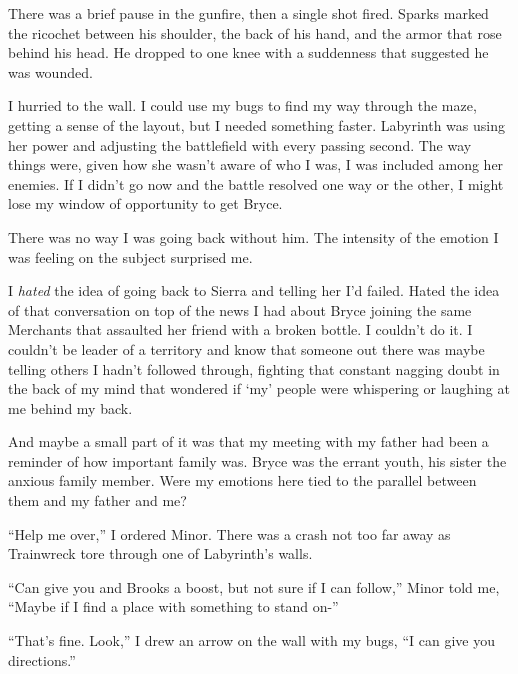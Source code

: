 There was a brief pause in the gunfire, then a single shot fired.  Sparks marked the ricochet between his shoulder, the back of his hand, and the armor that rose behind his head.  He dropped to one knee with a suddenness that suggested he was wounded.



I hurried to the wall.  I could use my bugs to find my way through the maze, getting a sense of the layout, but I needed something faster.  Labyrinth was using her power and adjusting the battlefield with every passing second.  The way things were, given how she wasn't aware of who I was, I was included among her enemies.  If I didn't go now and the battle resolved one way or the other, I might lose my window of opportunity to get Bryce.



There was no way I was going back without him.  The intensity of the emotion I was feeling on the subject surprised me.



I \emph{hated} the idea of going back to Sierra and telling her I'd failed.  Hated the idea of that conversation on top of the news I had about Bryce joining the same Merchants that assaulted her friend with a broken bottle.  I couldn't do it.  I couldn't be leader of a territory and know that someone out there was maybe telling others I hadn't followed through, fighting that constant nagging doubt in the back of my mind that wondered if `my' people were whispering or laughing at me behind my back.



And maybe a small part of it was that my meeting with my father had been a reminder of how important family was.  Bryce was the errant youth, his sister the anxious family member.  Were my emotions here tied to the parallel between them and my father and me?



``Help me over,'' I ordered Minor.  There was a crash not too far away as Trainwreck tore through one of Labyrinth's walls.



``Can give you and Brooks a boost, but not sure if I can follow,'' Minor told me, ``Maybe if I find a place with something to stand on-''



``That's fine.  Look,''  I drew an arrow on the wall with my bugs, ``I can give you directions.''



